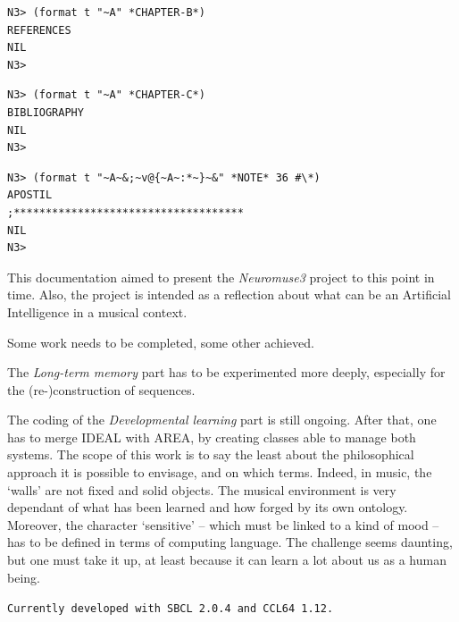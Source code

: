 \documentclass{article}
\begin{document}
\begin{lstlisting}[language=sectitle]
N3> (format t "~A" *CHAPTER-B*)
REFERENCES
NIL
N3> 
\end{lstlisting}

\bigskip
\bigskip

\begin{lstlisting}[language=sectitle]
N3> (format t "~A" *CHAPTER-C*)
BIBLIOGRAPHY
NIL
N3> 
\end{lstlisting}


\bigskip
\bigskip

\begin{lstlisting}[language=sectitle]
N3> (format t "~A~&;~v@{~A~:*~}~&" *NOTE* 36 #\*)
APOSTIL
;************************************
NIL
N3> 
\end{lstlisting}

\bigskip

This documentation aimed to present the \textsl{Neuromuse3} project to this point in time. Also, the project is intended as a reflection about what can be an Artificial Intelligence in a musical context. 

Some work needs to be completed, some other achieved.

\bigskip

The \textsl{Long-term memory} part has to be experimented more deeply, especially for the (re-)construction of sequences. 

\bigskip

The coding of the \textsl{Developmental learning} part is still ongoing. 
After that, one has to merge IDEAL with AREA, by creating classes able to manage both systems. The scope of this work is to say the least about the philosophical approach it is possible to envisage, and on which terms. Indeed, in music, the `walls' are not  fixed and solid objects. The musical environment is very dependant of what has been learned and how forged by its own ontology. Moreover, the character `sensitive' -- which must be linked to a kind of mood -- has to be defined in terms of computing language. The challenge seems daunting, but one must take it up, at least because it can learn a lot about us as a human being.

\bigskip

\texttt{\small Currently developed with SBCL 2.0.4 and CCL64 1.12.}
\end{document}
